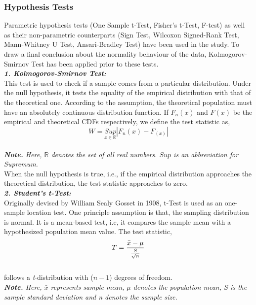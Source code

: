 \documentclass[12pt,a4paper]{report}
\begin{document}
\subsubsection{\large{Hypothesis Tests}}
\Large{Parametric hypothesis tests (One Sample t-Test, Fisher's t-Test, F-test) as well as their non-parametric counterparts (Sign Test, Wilcoxon Signed-Rank Test, Mann-Whitney U Test, Ansari-Bradley Test) have been used in the study. To draw a final conclusion about the normality behaviour of the data, Kolmogorov-Smirnov Test has been applied prior to these tests. }\\[20pt]
\Large{{\textbf{\textit{1. Kolmogorov-Smirnov Test: }}} }\\[10pt]
\Large{This test is used to check if a sample comes from a particular distribution. Under the null hypothesis, it tests the equality of the empirical distribution with that of the theoretical one. According to the assumption, the theoretical population must have an absolutely continuous distribution function. If $F_n(x)$ and $F(x)$ be the empirical and theoretical  CDFs respectively, we define the test statistic as,}\\
\begin{equation}
W = \underset{x\in \mathbb{R}}{Sup} |F_n(x) - F_(x)|
\end{equation}\\
\large{\textit{{\textbf{Note.}} Here, $\mathbb{R}$ denotes the set of all real numbers. $Sup$ is an abbreviation for Supremum.}}\\[10pt]
\Large{When the null hypothesis is true, i.e., if the empirical distribution approaches the theoretical distribution, the test statistic approaches to zero.}\\[20 pt]
\Large{{\textbf{\textit{2. Student's t-Test: }}} }\\
\Large{Originally devised by William Sealy Gosset in 1908, t-Test is used as an one-sample location test. One principle assumption is that, the sampling distribution is normal. It is a mean-based test, i.e, it compares the sample mean with a hypothesized population mean value. The test statistic,}\\
\begin{equation}
T = \frac{\bar{x} - \mu}{\frac{S}{\sqrt{n}}}\\
\end{equation}\\[8pt]
\Large{follows a \textit{t}-distribution with ($n-1$) degrees of freedom.}\\[6pt]
\large{\textit{{\textbf{Note.}} Here, $\bar{x}$ represents sample mean, $\mu$ denotes the population mean, S is the sample standard deviation and n denotes the sample size.}}\\[20pt]
\end{document}
